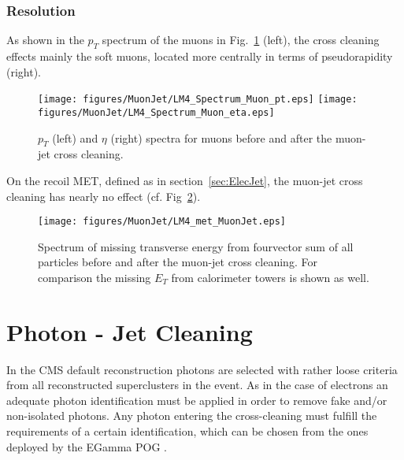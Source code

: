 \documentclass{cmspaper}
\begin{document}
\subsubsection{Resolution}
As shown in the \(p_T\) spectrum of the muons in
Fig.~\ref{fig:ObjSpectra_MuonJet} (left), the cross cleaning effects mainly
the soft muons, located more centrally in terms of pseudorapidity (right).

\begin{figure}[hb]
\begin{center}
    \texttt{[image: figures/MuonJet/LM4\_Spectrum\_Muon\_pt.eps]}
    \texttt{[image: figures/MuonJet/LM4\_Spectrum\_Muon\_eta.eps]}
    \caption{\(p_T\) (left) and \(\eta\) (right) spectra for muons before and
    after the muon-jet cross cleaning.}
\label{fig:ObjSpectra_MuonJet}
\end{center}
\end{figure} 

On the recoil MET, defined as in section~\ref{sec:ElecJet}, the muon-jet cross
cleaning has nearly no effect (cf. Fig~\ref{fig:met_MuonJet}).

\begin{figure}[hb]
\begin{center}
    \texttt{[image: figures/MuonJet/LM4\_met\_MuonJet.eps]}
    \caption{Spectrum of missing transverse energy from fourvector sum of all
    particles before and after the muon-jet cross cleaning. For comparison the
    missing $E_T$ from calorimeter towers is shown as well.}
\label{fig:met_MuonJet}
\end{center}
\end{figure}

\clearpage


\section{Photon - Jet Cleaning}
In the CMS default reconstruction photons are selected with rather loose
criteria from all reconstructed superclusters in the event. As in the case of
electrons an adequate photon identification must be applied in order to remove
fake and/or non-isolated photons. Any photon entering the cross-cleaning must
fulfill the requirements of a certain identification, which can be chosen from
the ones deployed by the EGamma POG \cite{photonID}. 
\end{document}
